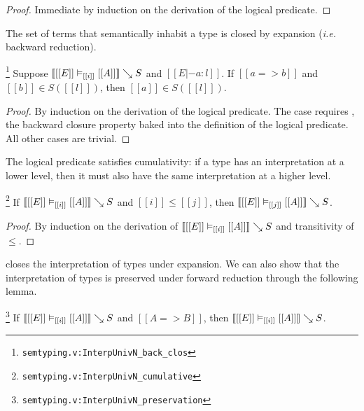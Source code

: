 \documentclass[acmsmall, screen=true, nonacm=true,
  review=\ifpublic false\else true\fi,
  anonymous=\ifanonymous true\else false\fi
]{acmart}
\makeatletter
\DeclarePairedDelimiter{\bracks}{\llbracket}{\rrbracket}
\newcommand{\ie}{\textit{i.e.}\@\xspace}
\newcommand{\suppl}[3]{{\scriptsize\texttt{#2:#3}}}
\newcommand{\interp}[4]{\bracks{#1 \vDash_{#2} #3} \searrow #4}
\newcommand{\member}[3]{#1 \in #3(#2)}
\newlength{\punctwidth}
\newcommand{\stack}[1]{%
  \settowidth{\punctwidth}{#1}%
  \hspace*{-\the\punctwidth}%
}
\providecommand{\DIFadd}[1]{{\protect\color{blue}\uwave{#1}}} %
\providecommand{\DIFdel}[1]{{\protect\color{red}\sout{#1}}}                      %
\providecommand{\DIFaddbegin}{} %
\providecommand{\DIFaddend}{} %
\providecommand{\DIFdelbegin}{} %
\providecommand{\DIFdelend}{} %
\makeatother
\begin{document}
\begin{proof}
  Immediate by induction on the derivation of the logical
  predicate.
\end{proof}

The set of terms that semantically inhabit a type is closed by
expansion (\ie backward reduction).

\begin{lemma}
  \stack{.~}\footnote{\suppl{theories}{semtyping.v}{InterpUnivN\_back\_clos}}
  \label{lem:backclos}
  Suppose $\interp{[[E]]}{[[i]]}{[[A]]}{S}$ and $[[E |- a : l]]$.
  If $[[a => b]]$ and $\member{[[b]]}{[[l]]}{S}$,
  then $\member{[[a]]}{[[l]]}{S}$.
\end{lemma}

\begin{proof}
  By induction on the derivation of the logical predicate. The
   case requires , the backward
  closure property baked into the definition of the logical
  predicate. All other cases are trivial.
\end{proof}

The logical predicate satisfies cumulativity: if a type has an
interpretation at a lower level, then it must also have the same
interpretation at a higher level.

\begin{lemma}[Cumulativity]
  \stack{.~}\footnote{\suppl{theories}{semtyping.v}{InterpUnivN\_cumulative}}
  \label{lem:cumulativity}
  If $\interp{[[E]]}{[[i]]}{[[A]]}{S}$ and $[[i]] \leq [[j]]$, then
  $\interp{[[E]]}{[[j]]}{[[A]]}{S}$.
\end{lemma}

\begin{proof}
  By induction on the derivation of $\interp{[[E]]}{[[i]]}{[[A]]}{S}$
  and transitivity of $\leq$.
\end{proof}

 closes the interpretation of types under
expansion. We can also show that the interpretation of types is
preserved under forward reduction through the following lemma.

\begin{lemma}
  \stack{.~}\footnote{\suppl{theories}{semtyping.v}{InterpUnivN\_preservation}}
\label{lem:lrpreservation}
  If $\interp{[[E]]}{[[i]]}{[[A]]}{S}$ and $[[A => B]]$, then
  \DIFdelbegin \DIFdel{$\interp{[[E]]}{[[i]]}{[[A]]}{S}$}\DIFdelend \DIFaddbegin \DIFadd{$\interp{[[E]]}{[[i]]}{[[B]]}{S}$}\DIFaddend .
\end{lemma}
\end{document}
